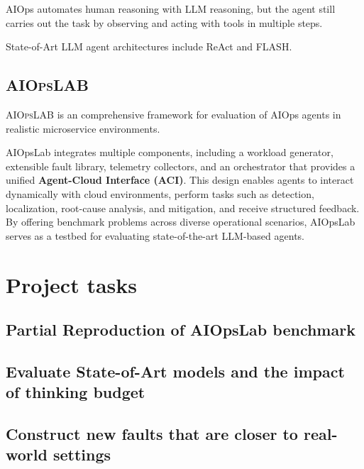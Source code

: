 \documentclass[conference]{IEEEtran}
\begin{document}
        AIOps automates human reasoning with LLM reasoning, but the agent still carries out the task by observing and acting with tools in multiple steps.     

        State-of-Art LLM agent architectures include ReAct\cite{yao2023reactsynergizingreasoningacting} and FLASH\cite{zhang2024flash}.

\subsection{\textsc{AIOps}LAB}
\textsc{AIOps}LAB\cite{chen2025aiopslab} is an comprehensive framework for evaluation of AIOps agents in realistic microservice environments.  

AIOpsLab integrates multiple components, including a workload generator, extensible fault library, telemetry collectors, and an orchestrator that provides a unified \textbf{Agent-Cloud Interface (ACI)}. This design enables agents to interact dynamically with cloud environments, perform tasks such as detection, localization, root-cause analysis, and mitigation, and receive structured feedback. By offering benchmark problems across diverse operational scenarios, AIOpsLab serves as a testbed for evaluating state-of-the-art LLM-based agents.

\section{Project tasks}

\subsection{Partial Reproduction of AIOpsLab benchmark}
\subsection{Evaluate State-of-Art models and the impact of thinking budget}
\subsection{Construct new faults that are closer to real-world settings}









\vspace{12pt}
\end{document}
